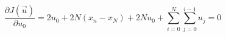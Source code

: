 \documentclass{article}
\begin{document}
\thispagestyle{empty}

$$
\frac{\partial J(\vec{u})}{\partial u_0}  = 2 u_0 + 2N(x_n-x_N) + 2N u_0 +    \sum\limits_{i=0}^N \sum\limits_{j=0}^{i-1}u_j  = 0
$$
\end{document}
